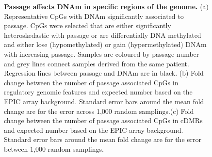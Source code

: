 \documentclass[a4paper]{article}
\begin{document}
\begin{figure}
\begin{centering}
\hfil
{}
\hfil
{}

\caption{\textbf{Passage affects DNAm in specific regions of the genome.} (a) Representative CpGs with DNAm significantly associated to passage. CpGs were selected that are either significantly heteroskedastic with passage or are differentially DNA methylated and either lose (hypomethylated) or gain (hypermethylated) DNAm with increasing passage. Samples are coloured by passage number and grey lines connect samples derived from the same patient. Regression lines between passage and DNAm are in black. (b) Fold change between the number of passage associated CpGs in regulatory genomic features and expected number based on the EPIC array background. Standard error bars around the mean fold change are for the error across 1,000 random samplings.(c) Fold change between the number of passage associated CpGs in cDMRs and expected number based on the EPIC array background. Standard error bars around the mean fold change are for the error between 1,000 random samplings.}

\label{fig:main}
\end{centering}
\end{figure}
\end{document}
